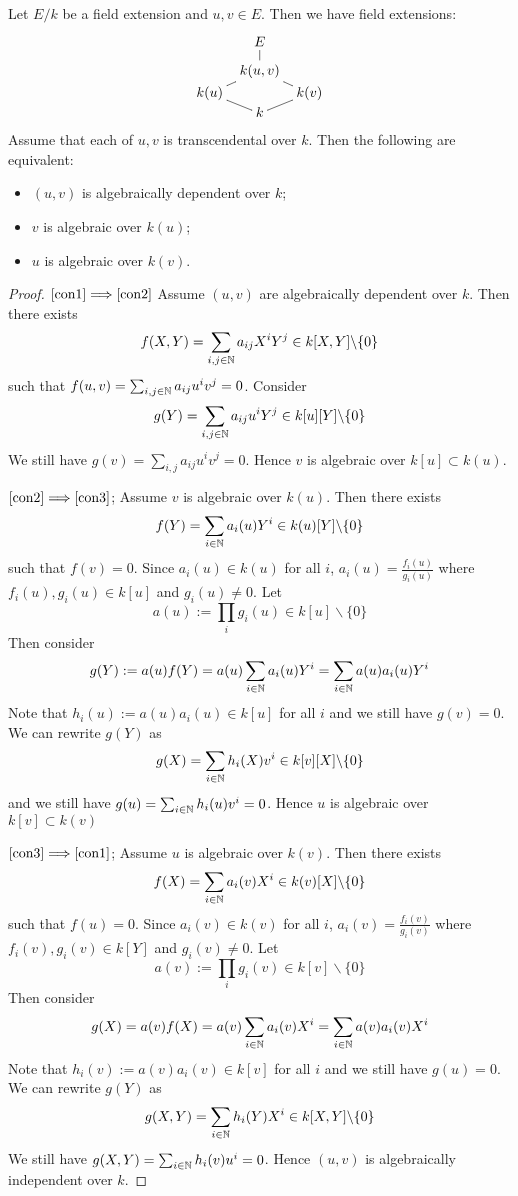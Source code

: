\begin{lemma} \label {i9283hd01bxdo912ep01}
	Let $E/k$ be a field extension and $u,v \in E$.  
	Then we have field extensions:
	$$
	\xymatrix@R=0pt@C=6pt{
	& E  \\
	\\
	& k(u,v) \ar @{-} [dl] \ar @{-} [dr] \ar @{-} [uu] \\
	k(u) && k(v) \\
	& k \ar @{-} [ul] \ar @{-} [ur]
	}
	$$
	Assume that each of $u,v$ is transcendental over $k$. 
	Then the following are equivalent:
\begin{itemize}
	\item \label{con1} $(u,v)$ is algebraically dependent over $k$;
	\item \label{con2} $v$ is algebraic over $k(u)$;
	\item \label{con3} $u$ is algebraic over $k(v)$.
\end{itemize}
\end{lemma}

\begin{proof}
$\eqref{con1}  \Longrightarrow \eqref{con2} $ Assume $(u,v)$ 
are algebraically dependent over $k$. Then there 
exists $$ f(X,Y) = \sum_{i,j \in \mathbb{N}} a_{ij} X^iY^j \in 
k[X,Y] \backslash \lbrace 0 \rbrace $$ such that
$f(u,v) = \sum_{i,j \in \mathbb{N}} a_{ij} u^iv^j = 0 $. 
Consider $$g(Y) = \sum_{i,j \in \mathbb{N}} a_{ij} u^iY^j 
\in k[u][Y] \backslash \lbrace 0 \rbrace $$ We still 
have $g(v) = \sum_{i,j} a_{ij} u^iv^j = 0 $. 
Hence $v$ is algebraic over $k[u] \subset k(u)$. 


$\eqref{con2} \Longrightarrow \eqref{con3} $; Assume $v$ is 
algebraic over $k(u)$. Then there exists
$$ f(Y) = \sum_{i\in \mathbb{N}} a_i(u)Y^i \in k(u)[Y] \backslash \lbrace 0 \rbrace $$ 
such that $f(v) = 0$. Since $a_i(u) \in k(u)$ for 
all $i$, $a_i(u) = \frac{f_i(u)}{g_i(u)} $ 
where $f_i(u),g_i(u) \in k[u]$ and $g_i(u) \neq 0 $. 
Let $$a(u) := \prod_i g_i(u) \in k[u] \backslash \lbrace 0 \rbrace $$ 
Then consider $$ g(Y) := a(u)f(Y) = a(u)\sum_{i\in \mathbb{N}}
a_i(u)Y^i = \sum_{i \in \mathbb{N}}a(u) a_i(u)Y^i $$ 
Note that $h_i(u):=a(u)a_i(u) \in k[u] $ for all $i$ 
and we still have $g(v) = 0 $. We can rewrite $g(Y)$ 
as $$ g(X) = \sum_{i \in \mathbb{N}} h_i(X)v^i \in k[v][X] \backslash \lbrace 0 \rbrace $$ 
and we still have  $g(u) = \sum_{i \in \mathbb{N}} h_i(u) v^i = 0 $. 
Hence $u$ is algebraic over $k[v] \subset k(v)$ 

$\eqref{con3} \Longrightarrow \eqref{con1}$; 
Assume $u$ is algebraic over $k(v)$. Then there 
exists $$ f(X) = \sum_{i \in \mathbb{N} } a_i(v)X^i \in k(v)[X] 
\backslash \lbrace 0 \rbrace $$ such that $f(u) = 0$. 
Since $a_i(v) \in k(v) $ for all $i$, $a_i(v)= \frac{f_i(v)}{g_i(v)}$ 
where $f_i(v),g_i(v) \in k[Y]$ and $g_i(v) \neq 0 $. 
Let $$a(v) := \prod_i g_i(v) \in k[v] \backslash \lbrace 0 \rbrace  $$ 
Then consider $$ g(X) = a(v)f(X) = a(v)\sum_{i \in \mathbb{N}} a_i(v)X^i 
= \sum_{i \in \mathbb{N}} a(v)a_i(v)X^i $$ Note that
$h_i(v):=a(v)a_i(v) \in k[v] $ for all $i$ and we still 
have $g(u) = 0 $. We can rewrite $g(Y)$ as
$$ g(X,Y) = \sum_{i \in \mathbb{N}} h_i(Y)X^i \in k[X,Y] 
\backslash \lbrace 0 \rbrace  $$ We still have
$g(X,Y) = \sum_{i \in \mathbb{N}} h_i(v) u^i = 0 $. 
Hence $(u,v)$ is algebraically independent over $k$.
\end{proof}

